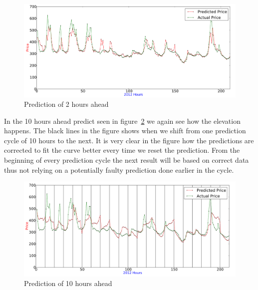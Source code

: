 \begin{figure}[H]
\centering
\includegraphics[width=\linewidth]{billeder/PriceExperimentalAnalysis/2HoursAheadForecast.png}
\caption{Prediction of 2 hours ahead}
\label{fig:2HoursAhead}
\end{figure}

In the 10 hours ahead predict seen in figure~\ref{fig:10HoursAhead} we again see how the elevation happens. The black lines in the figure shows when we shift from one prediction cycle of 10 hours to the next. It is very clear in the figure how the predictions are corrected to fit the curve better every time we reset the prediction. From the beginning of every prediction cycle the next result will be based on correct data thus not relying on a potentially faulty prediction done earlier in the cycle.

\begin{figure}[H]
\centering
\includegraphics[width=\linewidth]{billeder/PriceExperimentalAnalysis/10HoursAhead.png}
\caption{Prediction of 10 hours ahead}
\label{fig:10HoursAhead}
\end{figure}

